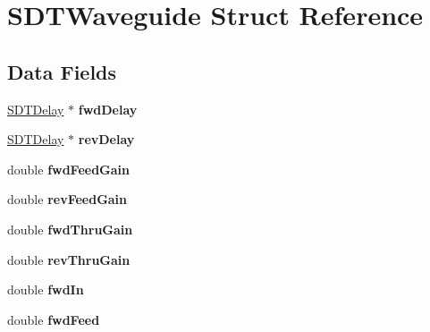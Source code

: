\hypertarget{struct_s_d_t_waveguide}{}\section{S\+D\+T\+Waveguide Struct Reference}
\label{struct_s_d_t_waveguide}
\subsection*{Data Fields}
\begin{DoxyCompactItemize}
\item 
\hypertarget{struct_s_d_t_waveguide_ae272280d7f203cfd970d72b31064cc85}{}\hyperlink{struct_s_d_t_delay}{S\+D\+T\+Delay} $\ast$ {\bfseries fwd\+Delay}\label{struct_s_d_t_waveguide_ae272280d7f203cfd970d72b31064cc85}

\item 
\hypertarget{struct_s_d_t_waveguide_a1734fab41421bd830fbdf2c0befaebfa}{}\hyperlink{struct_s_d_t_delay}{S\+D\+T\+Delay} $\ast$ {\bfseries rev\+Delay}\label{struct_s_d_t_waveguide_a1734fab41421bd830fbdf2c0befaebfa}

\item 
\hypertarget{struct_s_d_t_waveguide_a73f4644b0849d9f460f0d9bdf868b172}{}double {\bfseries fwd\+Feed\+Gain}\label{struct_s_d_t_waveguide_a73f4644b0849d9f460f0d9bdf868b172}

\item 
\hypertarget{struct_s_d_t_waveguide_a312dfd02d42a6017cc751027cf513b88}{}double {\bfseries rev\+Feed\+Gain}\label{struct_s_d_t_waveguide_a312dfd02d42a6017cc751027cf513b88}

\item 
\hypertarget{struct_s_d_t_waveguide_a49196f5e2b0c50c946db1ccec21314e1}{}double {\bfseries fwd\+Thru\+Gain}\label{struct_s_d_t_waveguide_a49196f5e2b0c50c946db1ccec21314e1}

\item 
\hypertarget{struct_s_d_t_waveguide_ac7d4382529be3580cdffde3663a3fb5c}{}double {\bfseries rev\+Thru\+Gain}\label{struct_s_d_t_waveguide_ac7d4382529be3580cdffde3663a3fb5c}

\item 
\hypertarget{struct_s_d_t_waveguide_a0f13f316c802a74a5c3f065d69dcdbce}{}double {\bfseries fwd\+In}\label{struct_s_d_t_waveguide_a0f13f316c802a74a5c3f065d69dcdbce}

\item 
\hypertarget{struct_s_d_t_waveguide_a3521c8f69335c3594badbeceb8087a81}{}double {\bfseries fwd\+Feed}\label{struct_s_d_t_waveguide_a3521c8f69335c3594badbeceb8087a81}


\end{DoxyCompactItemize}
